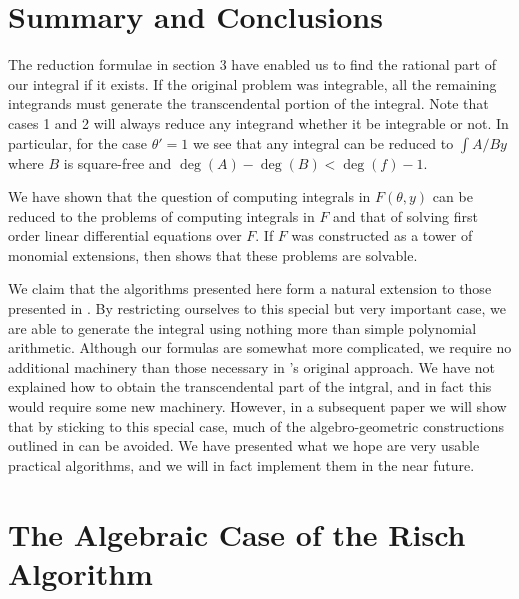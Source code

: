 \section{Summary and Conclusions}

The reduction formulae in section 3 have enabled us to find the rational
part of our integral if it exists.  If the original problem was
integrable, all the remaining integrands must generate the
transcendental portion of the integral.  Note that cases 1 and 2 will
always reduce any integrand whether it be integrable or not.  
In particular, for the case $\theta' = 1$ we see that any
integral can be reduced to $\int A / {B y} $ where $B$ is square-free
and $\deg(A) - \deg(B) < \deg(f) -1$.

We have shown that the question of computing integrals in
$F(\theta,y)$ can be reduced to the problems of computing integrals in
$F$ and that of solving first order linear differential equations over
$F$.  If $F$ was constructed as a tower of monomial extensions, then
\cite{Risch1969-pi} shows that these problems are solvable.

We claim that the algorithms presented here form a natural extension
to those presented in \cite{Risch1969-pi}.  By restricting
ourselves to this special but very important case, we are able to
generate the integral using nothing more than simple polynomial
arithmetic.  Although our formulas are somewhat more complicated, we
require no additional machinery than those necessary in {\Risch}'s
original approach.  We have not explained how to obtain the
transcendental part of the intgral, and in fact this would require
some new machinery.  However, in a subsequent paper we will show that
by sticking to this special case, much of the algebro-geometric
constructions outlined in \cite{Risch1970-na} can be
avoided. We have presented what we hope are very usable practical
algorithms, and we will in fact implement them in the near future.

\section{The Algebraic Case of the Risch Algorithm}


